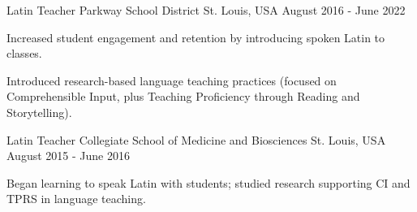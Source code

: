 

\begin{cventries}

  \cventry
    {Latin Teacher} %
    {Parkway School District} %
    {St. Louis, USA} %
    {August 2016 - June 2022} %
    {
      \begin{cvitems} %
        \item {Increased student engagement and retention by introducing spoken Latin to classes.}
        \item {Introduced research-based language teaching practices (focused on Comprehensible Input, plus Teaching Proficiency through Reading and Storytelling).}
      \end{cvitems}
    }

  \cventry
    {Latin Teacher} %
    {Collegiate School of Medicine and Biosciences} %
    {St. Louis, USA} %
    {August 2015 - June 2016} %
    {
      \begin{cvitems} %
        \item {Began learning to speak Latin with students; studied research supporting CI and TPRS in language teaching.}        
      \end{cvitems}
    }
    

\end{cventries}
